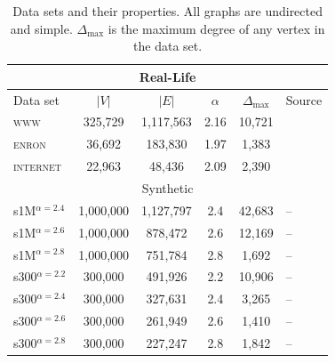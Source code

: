 \begin{table}[!ht]
\centering
\small
\begin{tabular}{lccccl}\hline
\multicolumn{6}{c}{Real-Life}\\\hline
Data set  & $\vert V \vert$ & $\vert E\vert$ & $\alpha$  & $\Delta_{\max}$ & Source\\\hline
\textsc{www}      & 325,729        & 1,117,563     & 2.16 & 10,721            & \cite{albert1999internet}\\
\textsc{enron}    &  36,692        &   183,830      & 1.97    &1,383         & \cite{leskovec2009community}\\
\textsc{internet} &  22,963        &    48,436      & 2.09     & 2,390        & \cite{newman}\\\hline

\multicolumn{6}{c}{Synthetic}\\\hline
s1M$^{\alpha=2.4}$    & 1,000,000       & 1,127,797      & 2.4    & 42,683 &-- \\
s1M$^{\alpha=2.6}$    & 1,000,000       & 878,472        & 2.6    & 12,169 &-- \\
s1M$^{\alpha=2.8}$    & 1,000,000       & 751,784         & 2.8   & 1,692  &-- \\
s300$^{\alpha=2.2}$    & 300,000        & 491,926        & 2.2    & 10,906 & --\\
s300$^{\alpha=2.4}$    & 300,000        & 327,631        & 2.4    & 3,265 & --\\
s300$^{\alpha=2.6}$    & 300,000        & 261,949        & 2.6    & 1,410 & --\\
s300$^{\alpha=2.8}$    & 300,000        & 227,247        & 2.8    & 1,842 & --\\\hline
\end{tabular}
\caption{Data sets and their properties. All graphs are undirected and simple. $\Delta_{\max}$ is the maximum degree of any vertex in the data set.}
\label{t:datasets}
\end{table}


